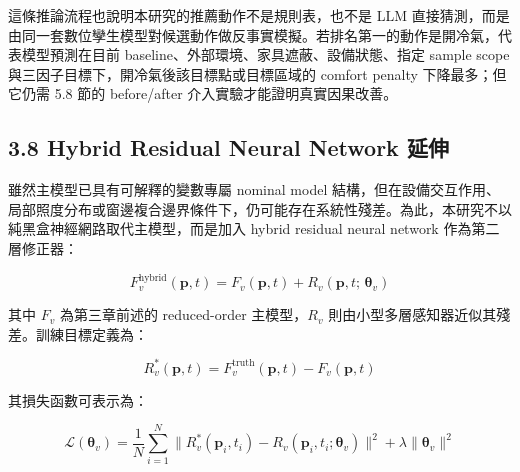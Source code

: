 \documentclass[12pt,a4paper]{article}
\begin{document}
這條推論流程也說明本研究的推薦動作不是規則表，也不是 LLM 直接猜測，而是由同一套數位孿生模型對候選動作做反事實模擬。若排名第一的動作是開冷氣，代表模型預測在目前 baseline、外部環境、家具遮蔽、設備狀態、指定 sample scope 與三因子目標下，開冷氣後該目標點或目標區域的 comfort penalty 下降最多；但它仍需 5.8 節的 before/after 介入實驗才能證明真實因果改善。


\subsection*{3.8 Hybrid Residual Neural Network 延伸}

雖然主模型已具有可解釋的變數專屬 nominal model 結構，但在設備交互作用、局部照度分布或窗邊複合邊界條件下，仍可能存在系統性殘差。為此，本研究不以純黑盒神經網路取代主模型，而是加入 hybrid residual neural network 作為第二層修正器：


\[
F_v^{\text{hybrid}}(\mathbf{p},t) = F_v(\mathbf{p},t) + R_v(\mathbf{p},t;\,\boldsymbol{\theta}_v)
\]

其中 $F_v$ 為第三章前述的 reduced-order 主模型，$R_v$ 則由小型多層感知器近似其殘差。訓練目標定義為：


\[
R_v^*(\mathbf{p},t) = F_v^{\text{truth}}(\mathbf{p},t) - F_v(\mathbf{p},t)
\]

其損失函數可表示為：


\[
\mathcal{L}(\boldsymbol{\theta}_v) = \frac{1}{N}\sum_{i=1}^{N}\bigl\|R_v^*(\mathbf{p}_i,t_i) - R_v(\mathbf{p}_i,t_i;\boldsymbol{\theta}_v)\bigr\|^2 + \lambda\|\boldsymbol{\theta}_v\|^2
\]
\end{document}
